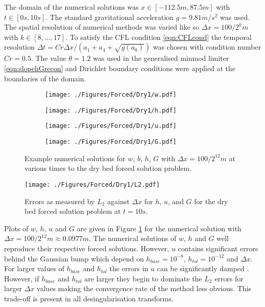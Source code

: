 \documentclass[AMA,STIX1COL]{WileyNJD-v2}
\DeclareRobustCommand{\squareF}[1]{\tikz{\filldraw[#1,fill opacity= 0.3] (0,0) rectangle (0.2cm,0.2cm);}}
\begin{document}
The domain of the numerical solutions was $x \in \left[-112.5 m,87.5 m\right]$ with $t \in \left[0s,10s\right]$. The standard gravitational acceleration $g= 9.81 m/s^2$ was used. The spatial resolution of numerical methods was varied like so $\Delta x = 100 / 2^k m$ with $k \in \left[8,\dots,17\right]$. To satisfy the CFL condition \eqref{eqn:CFLcond} the temporal resolution
$\Delta t = Cr \Delta x / \left(a_1 + a_4 + \sqrt{g\left(a_0\right)}\right)$ was chosen with condition number $Cr = 0.5$. The value $\theta = 1.2$ was used in the generalised minmod limiter \eqref{eqn:slopehGrecon} and Dirichlet boundary conditions were applied at the boundaries of the domain. 
\begin{figure}
	\centering
	\begin{subfigure}{0.5\textwidth}
		\texttt{[image: ./Figures/Forced/Dry1/w.pdf]}
		\subcaption{$w$ and $b$ (\squareF{brown!60!black})}
		\vspace{0.2cm}
	\end{subfigure}%
	\begin{subfigure}{0.5\textwidth}
	\texttt{[image: ./Figures/Forced/Dry1/h.pdf]}
		\vspace{0.2cm}
	\end{subfigure}
	\begin{subfigure}{0.5\textwidth}
\texttt{[image: ./Figures/Forced/Dry1/u.pdf]}
		\vspace{0.2cm}
	\end{subfigure}%
	\begin{subfigure}{0.5\textwidth}
\texttt{[image: ./Figures/Forced/Dry1/G.pdf]}
		\vspace{0.2cm}
	\end{subfigure}
	\caption{Example numerical solutions for $w$, $b$, $h$, $G$ with $\Delta x = 100 / 2^{12}m$ at various times to the dry bed forced solution problem.}
	\label{fig:ExampleForcedSolutionDry}
\end{figure}
\begin{figure}
	\centering
		\texttt{[image: ./Figures/Forced/Dry1/L2.pdf]}
	\caption{Errors as measured by $L_2$ against $\Delta x$ for $h$, $u$, and $G$ for the dry bed forced solution problem at $t=10s$.}
	\label{fig:L1convergenceforcedWet}
\end{figure}

Plots of $w$, $h$, $u$ and $G$ are given in Figure \ref{fig:ExampleForcedSolutionDry} for the numerical solution with $\Delta x = 100 / 2^{12}m\approx 0.0977m$. The numerical solutions of $w$, $h$ and $G$ well reproduce their respective forced solutions. However, $u$ contains significant errors behind the Gaussian bump which depend on $h_{{base}} = 10^{-8}$, $h_{{tol}} = 10^{-12}$ and $\Delta x$. For larger values of $h_{{base}}$ and $h_{{tol}}$ the errors in $u$ can be significantly damped \cite{Kurganov-Petrova-2007-707}. However, if $h_{{base}}$ and $h_{{tol}}$ are larger they begin to dominate the $L_2$ errors for larger $\Delta x$ values making the convergence rate of the method less obvious. This trade-off is present in all desingularisation transforms.
\end{document}
